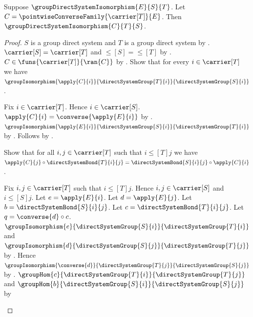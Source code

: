 \begin{theorem}\label{group_direct_system_isomorphism_converse}
    Suppose $\groupDirectSystemIsomorphism{E}{S}{T}$.
    Let $C=\pointwiseConverseFamily{\carrier[T]}{E}$.
    Then $\groupDirectSystemIsomorphism{C}{T}{S}$.
\end{theorem}
\begin{proof}
    $S$ is a group direct system and $T$ is a group direct system by
        .
    $\carrier[S]=\carrier[T]$ and $\leq[S]=\leq[T]$ by
        .
    $C\in\funs{\carrier[T]}{\ran{C}}$ by
        .
    Show that for every $i\in\carrier[T]$ we have
        $\groupIsomorphism{\apply{C}{i}}
            {\directSystemGroup{T}{i}}{\directSystemGroup{S}{i}}$.
    \begin{subproof}
        Fix $i\in\carrier[T]$.
        Hence $i\in\carrier[S]$.
        $\apply{C}{i}=\converse{\apply{E}{i}}$ by
            .
        $\groupIsomorphism{\apply{E}{i}}
            {\directSystemGroup{S}{i}}{\directSystemGroup{T}{i}}$ by
            .
        Follows by .
    \end{subproof}
    Show that for all $i,j\in\carrier[T]$ such that
        $i\mathrel{\leq[T]}j$ we have
        $\apply{C}{j}\circ\directSystemBond{T}{i}{j}
            =\directSystemBond{S}{i}{j}\circ\apply{C}{i}$.
    \begin{subproof}
        Fix $i,j\in\carrier[T]$ such that $i\mathrel{\leq[T]}j$.
        Hence $i,j\in\carrier[S]$ and
            $i\mathrel{\leq[S]}j$.
        Let $e=\apply{E}{i}$.
        Let $d=\apply{E}{j}$.
        Let $b=\directSystemBond{S}{i}{j}$.
        Let $c=\directSystemBond{T}{i}{j}$.
        Let $q=\converse{d}\circ c$.
        $\groupIsomorphism{e}
            {\directSystemGroup{S}{i}}{\directSystemGroup{T}{i}}$ and
            $\groupIsomorphism{d}
            {\directSystemGroup{S}{j}}{\directSystemGroup{T}{j}}$ by
            .
        Hence $\groupIsomorphism{\converse{d}}
            {\directSystemGroup{T}{j}}{\directSystemGroup{S}{j}}$ by
            .
        $\groupHom{c}{\directSystemGroup{T}{i}}
            {\directSystemGroup{T}{j}}$ and
            $\groupHom{b}{\directSystemGroup{S}{i}}
            {\directSystemGroup{S}{j}}$ by

\end{subproof}
\end{proof}
